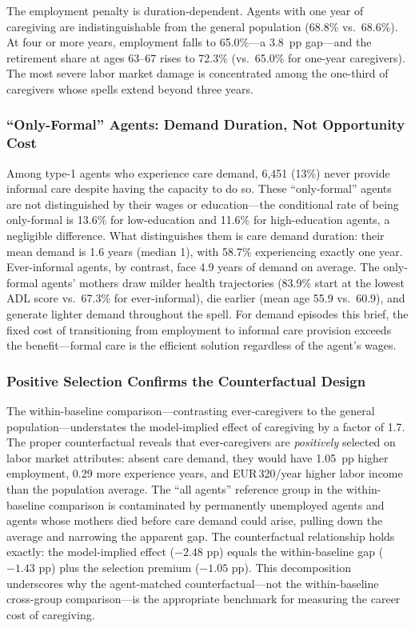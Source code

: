 The employment penalty is duration-dependent. Agents with one year of caregiving are indistinguishable from the general population (68.8\% vs.\ 68.6\%). At four or more years, employment falls to 65.0\%---a 3.8~pp gap---and the retirement share at ages 63--67 rises to 72.3\% (vs.\ 65.0\% for one-year caregivers). The most severe labor market damage is concentrated among the one-third of caregivers whose spells extend beyond three years.

\subsubsection{``Only-Formal'' Agents: Demand Duration, Not Opportunity Cost}

Among type-1 agents who experience care demand, 6,451 (13\%) never provide informal care despite having the capacity to do so. These ``only-formal'' agents are not distinguished by their wages or education---the conditional rate of being only-formal is 13.6\% for low-education and 11.6\% for high-education agents, a negligible difference. What distinguishes them is care demand duration: their mean demand is 1.6 years (median 1), with 58.7\% experiencing exactly one year. Ever-informal agents, by contrast, face 4.9 years of demand on average. The only-formal agents' mothers draw milder health trajectories (83.9\% start at the lowest ADL score vs.\ 67.3\% for ever-informal), die earlier (mean age 55.9 vs.\ 60.9), and generate lighter demand throughout the spell. For demand episodes this brief, the fixed cost of transitioning from employment to informal care provision exceeds the benefit---formal care is the efficient solution regardless of the agent's wages.

\subsubsection{Positive Selection Confirms the Counterfactual Design}

The within-baseline comparison---contrasting ever-caregivers to the general population---understates the model-implied effect of caregiving by a factor of 1.7. The proper counterfactual reveals that ever-caregivers are \textit{positively} selected on labor market attributes: absent care demand, they would have 1.05~pp higher employment, 0.29 more experience years, and EUR\,320/year higher labor income than the population average. The ``all agents'' reference group in the within-baseline comparison is contaminated by permanently unemployed agents and agents whose mothers died before care demand could arise, pulling down the average and narrowing the apparent gap. The counterfactual relationship holds exactly: the model-implied effect ($-2.48$ pp) equals the within-baseline gap ($-1.43$ pp) plus the selection premium ($-1.05$ pp). This decomposition underscores why the agent-matched counterfactual---not the within-baseline cross-group comparison---is the appropriate benchmark for measuring the career cost of caregiving.


